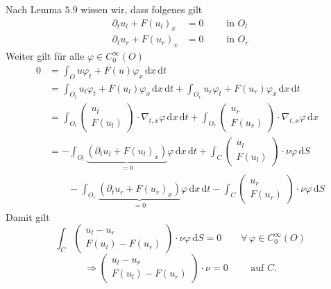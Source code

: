 \begin{beweis}
	Nach Lemma $5.9$ wissen wir, dass folgenes gilt
	\begin{align*}
		\partial_t u_l + F(u_l)_x &= 0 \qquad \text{ in }O_l \\
		\partial_t u_r + F(u_r)_x &= 0 \qquad \text{ in }O_r
	\end{align*}
	Weiter gilt für alle $\varphi \in C_0^{\infty}(O)$
	\begin{align*}
		0 &= \int_{O}^{} u \varphi_t + F(u) \varphi_x \,\mathrm{d}x\,\mathrm{d}t \\
		&= \int_{O_l}^{} u_l \varphi_t + F(u_l) \varphi_x \,\mathrm{d}x\,\mathrm{d}t  +  \int_{O_r}^{} u_r \varphi_t + F(u_r) \varphi_x \,\mathrm{d}x\,\mathrm{d}t \\
		&= \int_{O_l}^{} \begin{pmatrix}
			u_l \\ F(u_l)
		\end{pmatrix} \cdot  \nabla_{t,x} \varphi \,\mathrm{d}x \, \mathrm{d}t + \int_{O_r}^{} \begin{pmatrix}
			u_r \\ F(u_r)
		\end{pmatrix} \cdot  \nabla_{t,x} \varphi \,\mathrm{d}x \\
		&= - \int_{O_l}^{} \underset{=0}{\underbrace{(\partial_t u_l + F(u_l)_x)}} \varphi \,\mathrm{d}x \,\mathrm{d}t + \int_{C}^{} \begin{pmatrix}
			u_l \\ F(u_l)
		\end{pmatrix} \cdot \nu \varphi \,\mathrm{d}S \\
		& \qquad - \int_{O_r}^{} \underset{=0}{\underbrace{(\partial_t u_r + F(u_r)_x)}} \varphi \,\mathrm{d}x \,\mathrm{d}t - \int_{C}^{} \begin{pmatrix}
					u_r \\ F(u_r)
				\end{pmatrix} \cdot \nu \varphi \,\mathrm{d}S
	\end{align*}
	Damit gilt
	\[
		\int_{C}^{} \begin{pmatrix}
			u_l - u_r \\ F(u_l)-F(u_r)
		\end{pmatrix} \cdot \nu \varphi \,\mathrm{d}S=0 \qquad \forall\, \varphi \in C^{\infty}_0(O)
	\]
	\[
		\Rightarrow \begin{pmatrix}
			u_l-u_r \\ F(u_l)- F(u_r)
		\end{pmatrix} \cdot \nu =0 \qquad \text{ auf }C.
	\]
\end{beweis}


